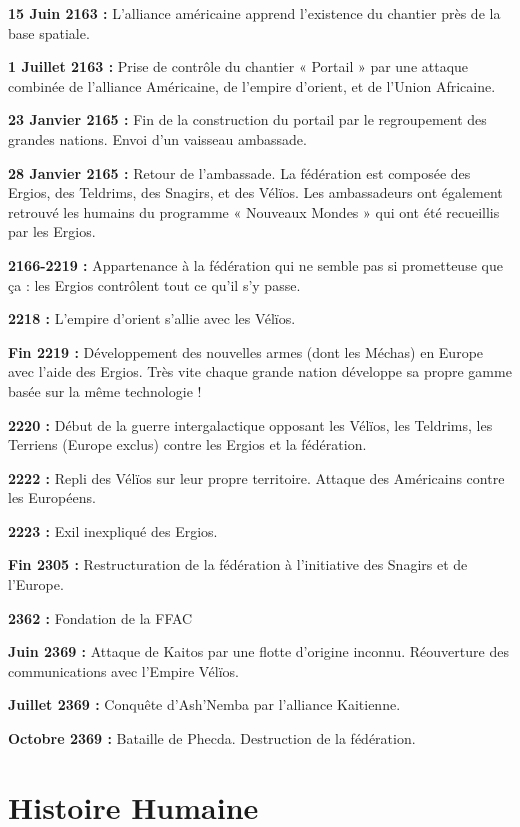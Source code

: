 \begin{multicols}{2}
\textbf{15 Juin 2163 :} L’alliance américaine apprend l’existence du chantier près de la base spatiale. 

\textbf{1 Juillet 2163 :} Prise de contrôle du chantier « Portail » par une attaque combinée de l’alliance Américaine, de l’empire d’orient, et de l’Union Africaine. 

\textbf{23 Janvier 2165 :} Fin de la construction du portail par le regroupement des grandes nations. Envoi d’un vaisseau ambassade.
 
\textbf{28 Janvier 2165 :} Retour de l’ambassade. La fédération est composée des Ergios, des Teldrims, des Snagirs, et des Vélïos. Les ambassadeurs ont également retrouvé les humains du programme « Nouveaux Mondes » qui ont été recueillis par les Ergios.

\textbf{2166-2219 :} Appartenance à la fédération qui ne semble pas si prometteuse que ça : les Ergios contrôlent tout ce qu’il s’y passe. 

\textbf{2218 :} L’empire d’orient s’allie avec les Vélïos.
 
\textbf{Fin 2219 :} Développement des nouvelles armes (dont les Méchas) en Europe avec l’aide des Ergios. Très vite chaque grande nation développe sa propre gamme basée sur la même technologie !
 
\textbf{2220 :} Début de la guerre intergalactique opposant les Vélïos, les Teldrims, les Terriens (Europe exclus) contre les Ergios et la fédération.

\textbf{2222 :} Repli des Vélïos sur leur propre territoire. Attaque des Américains contre les Européens. 

\textbf{2223 :} Exil inexpliqué des Ergios.
 
\textbf{Fin 2305 :} Restructuration de la fédération à l’initiative des Snagirs et de l’Europe. 

\textbf{2362 :} Fondation de la FFAC

\textbf{Juin 2369 :} Attaque de Kaitos par une flotte d’origine inconnu. Réouverture des communications avec l’Empire Vélïos.

\textbf{Juillet 2369 :} Conquête d'Ash'Nemba par l'alliance Kaitienne.

\textbf{Octobre 2369 :} Bataille de Phecda. Destruction de la fédération.

\end{multicols}

\chapter{Histoire Humaine}

